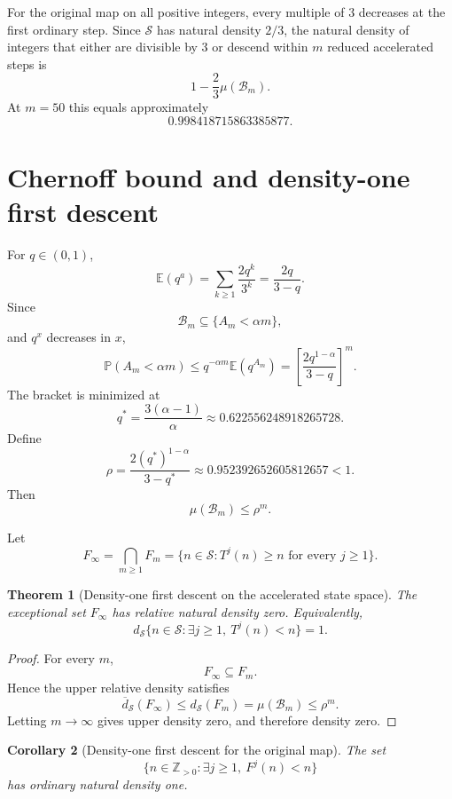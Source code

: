 \documentclass[11pt]{article}
\newtheorem{theorem}{Theorem}[section]
\newtheorem{corollary}[theorem]{Corollary}
\theoremstyle{definition}
\theoremstyle{remark}
\newcommand{\Sset}{\mathcal S}
\newcommand{\Z}{\mathbb Z}
\newcommand{\Prob}{\mathbb P}
\newcommand{\E}{\mathbb E}
\newcommand{\ds}{d_{\Sset}}
\begin{document}
For the original map on all positive integers, every multiple of $3$ decreases at the first ordinary step.  Since $\Sset$ has natural density $2/3$, the natural density of integers that either are divisible by $3$ or descend within $m$ reduced accelerated steps is
\begin{equation}
1-\frac23\mu(\mathcal B_m).
\label{eq:all-integers-finite-density}
\end{equation}
At $m=50$ this equals approximately
\[
0.998418715863385877.
\]

\section{Chernoff bound and density-one first descent}

For $q\in(0,1)$,
\[
\E(q^a)
=
\sum_{k\ge1}\frac{2q^k}{3^k}
=
\frac{2q}{3-q}.
\]
Since
\[
\mathcal B_m\subseteq\{A_m<\alpha m\},
\]
and $q^x$ decreases in $x$,
\[
\Prob(A_m<\alpha m)
\le
q^{-\alpha m}\E(q^{A_m})
=
\left[\frac{2q^{1-\alpha}}{3-q}\right]^m.
\]
The bracket is minimized at
\[
q^\ast=\frac{3(\alpha-1)}{\alpha}
\approx0.622556248918265728.
\]
Define
\begin{equation}
\rho
=
\frac{2(q^\ast)^{1-\alpha}}{3-q^\ast}
\approx0.952392652605812657<1.
\label{eq:rho}
\end{equation}
Then
\begin{equation}
\mu(\mathcal B_m)\le\rho^m.
\label{eq:chernoff}
\end{equation}

Let
\[
F_\infty
=
\bigcap_{m\ge1}F_m
=
\{n\in\Sset:T^j(n)\ge n\text{ for every }j\ge1\}.
\]

\begin{theorem}[Density-one first descent on the accelerated state space]
The exceptional set $F_\infty$ has relative natural density zero.  Equivalently,
\begin{equation}
\boxed{
\ds\{n\in\Sset:\exists j\ge1,\ T^j(n)<n\}=1.
}
\label{eq:density-one-S}
\end{equation}
\end{theorem}

\begin{proof}
For every $m$,
\[
F_\infty\subseteq F_m.
\]
Hence the upper relative density satisfies
\[
\overline d_{\Sset}(F_\infty)
\le
\ds(F_m)
=
\mu(\mathcal B_m)
\le\rho^m.
\]
Letting $m\to\infty$ gives upper density zero, and therefore density zero.
\end{proof}

\begin{corollary}[Density-one first descent for the original map]
The set
\[
\{n\in\Z_{>0}:\exists j\ge1,\ F^j(n)<n\}
\]
has ordinary natural density one.
\end{corollary}
\end{document}
